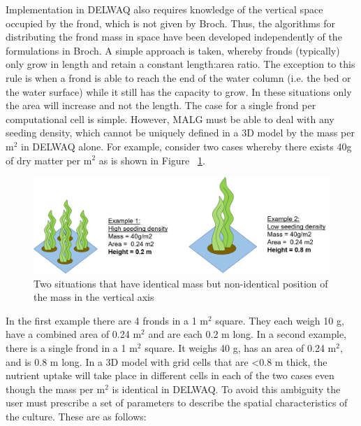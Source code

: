 \documentclass{deltares_manual}
\begin{document}
Implementation in DELWAQ also requires knowledge of the vertical space occupied by the frond, which is not given by Broch. Thus, the algorithms for distributing the frond mass in space have been developed independently of the formulations in Broch. A simple approach is taken, whereby fronds (typically) only grow in length and retain a constant length:area ratio. The exception to this rule is when a frond is able to reach the end of the water column (i.e. the bed or the water surface) while it still has the capacity to grow. In these situations only the area will increase and not the length. The case for a single frond per computational cell is simple. However, MALG must be able to deal with any seeding density, which cannot be uniquely defined in a 3D model by the mass per m$^{2}$ in DELWAQ alone. For example, consider two cases whereby there exists 40g of dry matter per m$^{2}$ as is shown in Figure ~\ref{fig:ambiguoussituation}. 
\begin{figure}[H]
	\centering
	\includegraphics[width=1\linewidth]{figures/ambiguous_situation}
	\caption{Two situations that have identical mass but non-identical position of the mass in the vertical axis}
	\label{fig:ambiguoussituation}
\end{figure}
In the first example there are 4 fronds in a 1 m$^{2}$ square. They each weigh 10 g, have a combined area of 0.24 m$^{2}$ and are each 0.2 m long. In a second example, there is a single frond in a 1 m$^{2}$ square. It weighs 40 g, has an area of 0.24 m$^{2}$, and is 0.8 m long. In a 3D model with grid cells that are \textless 0.8 m thick, the nutrient uptake will take place in different cells in each of the two cases even though the mass per m$^{2}$ is identical in DELWAQ. To avoid this ambiguity the user must prescribe a set of parameters to describe the spatial characteristics of the culture. These are as follows:
\end{document}
